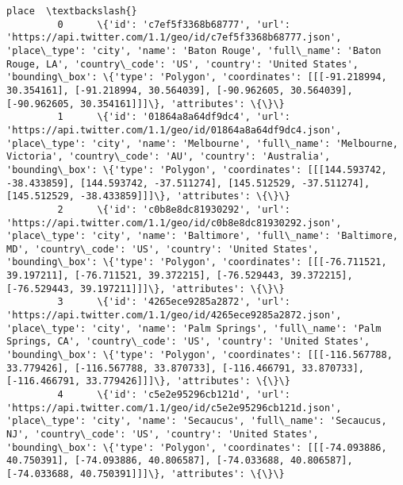 \documentclass[11pt]{article}
\begin{document}
\begin{Verbatim}[commandchars=\\\{\}]
                                                                                                                                                                                                                                                                                                                                                                                                                                   place  \textbackslash{}
         0      \{'id': 'c7ef5f3368b68777', 'url': 'https://api.twitter.com/1.1/geo/id/c7ef5f3368b68777.json', 'place\_type': 'city', 'name': 'Baton Rouge', 'full\_name': 'Baton Rouge, LA', 'country\_code': 'US', 'country': 'United States', 'bounding\_box': \{'type': 'Polygon', 'coordinates': [[[-91.218994, 30.354161], [-91.218994, 30.564039], [-90.962605, 30.564039], [-90.962605, 30.354161]]]\}, 'attributes': \{\}\}                 
         1      \{'id': '01864a8a64df9dc4', 'url': 'https://api.twitter.com/1.1/geo/id/01864a8a64df9dc4.json', 'place\_type': 'city', 'name': 'Melbourne', 'full\_name': 'Melbourne, Victoria', 'country\_code': 'AU', 'country': 'Australia', 'bounding\_box': \{'type': 'Polygon', 'coordinates': [[[144.593742, -38.433859], [144.593742, -37.511274], [145.512529, -37.511274], [145.512529, -38.433859]]]\}, 'attributes': \{\}\}               
         2      \{'id': 'c0b8e8dc81930292', 'url': 'https://api.twitter.com/1.1/geo/id/c0b8e8dc81930292.json', 'place\_type': 'city', 'name': 'Baltimore', 'full\_name': 'Baltimore, MD', 'country\_code': 'US', 'country': 'United States', 'bounding\_box': \{'type': 'Polygon', 'coordinates': [[[-76.711521, 39.197211], [-76.711521, 39.372215], [-76.529443, 39.372215], [-76.529443, 39.197211]]]\}, 'attributes': \{\}\}                     
         3      \{'id': '4265ece9285a2872', 'url': 'https://api.twitter.com/1.1/geo/id/4265ece9285a2872.json', 'place\_type': 'city', 'name': 'Palm Springs', 'full\_name': 'Palm Springs, CA', 'country\_code': 'US', 'country': 'United States', 'bounding\_box': \{'type': 'Polygon', 'coordinates': [[[-116.567788, 33.779426], [-116.567788, 33.870733], [-116.466791, 33.870733], [-116.466791, 33.779426]]]\}, 'attributes': \{\}\}           
         4      \{'id': 'c5e2e95296cb121d', 'url': 'https://api.twitter.com/1.1/geo/id/c5e2e95296cb121d.json', 'place\_type': 'city', 'name': 'Secaucus', 'full\_name': 'Secaucus, NJ', 'country\_code': 'US', 'country': 'United States', 'bounding\_box': \{'type': 'Polygon', 'coordinates': [[[-74.093886, 40.750391], [-74.093886, 40.806587], [-74.033688, 40.806587], [-74.033688, 40.750391]]]\}, 'attributes': \{\}\}                       

\end{Verbatim}
\end{document}
